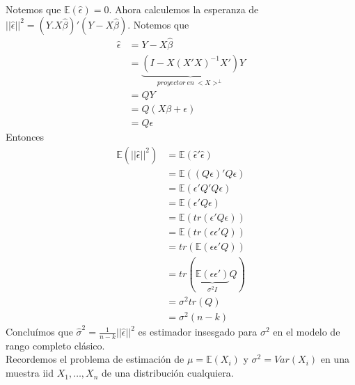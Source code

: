 \documentclass[10pt]{article}
\theoremstyle{plain}
\theoremstyle{definition}
\begin{document}
Notemos que $\mathbb{E}(\hat{\epsilon}) = 0$. Ahora calculemos la esperanza de $||\hat{\epsilon}||^2 = (Y.X\hat{\beta})'(Y-X\hat{\beta})$. Notemos que
\begin{align*}
\hat{\epsilon} &= Y -X \hat{\beta}\\
&= \underbrace{(I-X(X'X)^{-1}X')}_{proyector\ en\ <X>^{\perp}}Y\\
&= QY\\
&= Q(X\beta + \epsilon)\\
&= Q\epsilon
\end{align*}
Entonces
\begin{align*}
\mathbb{E}(||\hat{\epsilon}||^2) &= \mathbb{E}(\hat{\epsilon}'\hat{\epsilon})\\
&= \mathbb{E}((Q\epsilon)'Q\epsilon)\\
&= \mathbb{E}(\epsilon'Q'Q\epsilon)\\
&= \mathbb{E}(\epsilon'Q\epsilon)\\
&= \mathbb{E}(tr(\epsilon'Q\epsilon))\\
&= \mathbb{E}(tr(\epsilon\epsilon'Q))\\
&= tr(\mathbb{E}(\epsilon\epsilon'Q))\\
&= tr(\underbrace{\mathbb{E}(\epsilon\epsilon')}_{\sigma^2I}Q)\\
&= \sigma^2 tr(Q)\\
&= \sigma^2 (n-k)
\end{align*}
Concluímos que $\hat{\sigma}^2 = \frac{1}{n-k} ||\hat{\epsilon}||^2$ es estimador insesgado para $\sigma^2$ en el modelo de rango completo clásico.\\

Recordemos el problema de estimación de $\mu = \mathbb{E}(X_{i})$ y $\sigma^2 = Var(X_{i})$ en una muestra iid $X_{1},\ldots, X_{n}$ de una distribución cualquiera.\\
\end{document}
